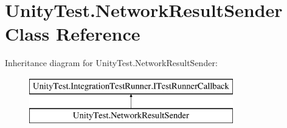 \hypertarget{class_unity_test_1_1_network_result_sender}{}\section{Unity\+Test.\+Network\+Result\+Sender Class Reference}
\label{class_unity_test_1_1_network_result_sender}
Inheritance diagram for Unity\+Test.\+Network\+Result\+Sender\+:\begin{figure}[H]
\begin{center}
\leavevmode
\includegraphics[height=2.000000cm]{class_unity_test_1_1_network_result_sender}
\end{center}
\end{figure}
